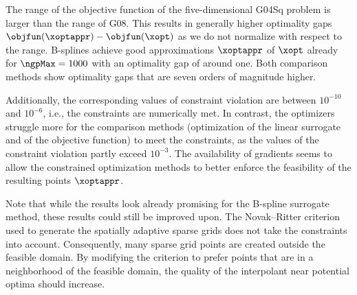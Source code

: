 The range of the objective function of the five-dimensional G04Sq problem
is larger than the range of G08.
This results in generally higher optimality gaps
$\objfun(\xoptappr) - \objfun(\xopt)$ as we do not normalize
with respect to the range.
B-splines achieve good approximations $\xoptappr$
of $\xopt$ already for $\ngpMax = 1000$ with an optimality gap of
around one.
Both comparison methods show optimality gaps that are
seven orders of magnitude higher.

Additionally, the corresponding values of constraint violation
are between $10^{-10}$ and $10^{-6}$, i.e.,
the constraints are numerically met.
In contrast, the optimizers struggle more for
the comparison methods (optimization of the linear surrogate and
of the objective function) to meet the constraints,
as the values of the constraint violation partly exceed $10^{-3}$.
The availability of gradients seems to allow the constrained optimization
methods to better enforce the feasibility of the
resulting points $\xoptappr$.

Note that while the results look already promising for the B-spline surrogate
method, these results could still be improved upon.
The Novak--Ritter criterion used to generate the
spatially adaptive sparse grids does not take the constraints into account.
Consequently, many sparse grid points are created outside the feasible domain.
By modifying the criterion to prefer points that are in a neighborhood of
the feasible domain, the quality of the interpolant near potential optima
should increase.
